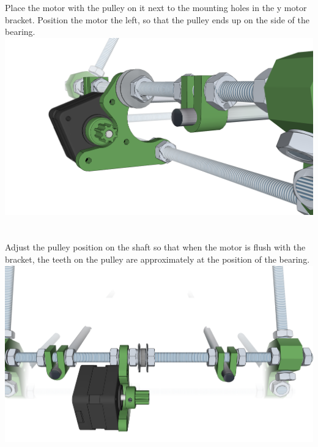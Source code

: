 \documentclass[twoside,openany,a4paper,titlepage]{memoir}
\begin{document}
	\section{}
	Place the motor with the pulley on it next to the mounting holes in the y motor bracket. Position the
	motor the left, so that the pulley ends up on the side of the bearing.\\
	\includegraphics[width=1\linewidth]{graphics/ch6_16.png}
	
	\section{}
	Adjust the pulley position on the shaft so that when the motor is flush with the bracket, the teeth on the
	pulley are approximately at the position of the bearing.\\
	\includegraphics[width=1\linewidth]{graphics/ch6_17.png}
	
\end{document}
